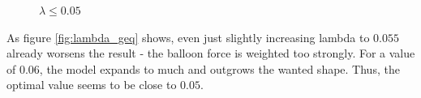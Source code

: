\begin{figure}[!hbt]
\centering   
{}
\caption{$\lambda \leq 0.05$}
\label{fig:lambda_leq}
\end{figure}

As figure \ref{fig:lambda_geq} shows, even just slightly increasing lambda to $0.055$ already worsens the result - the balloon force is weighted too strongly. For a value of $0.06$, the model expands to much and outgrows the wanted shape. Thus, the optimal value seems to be close to $0.05$.

